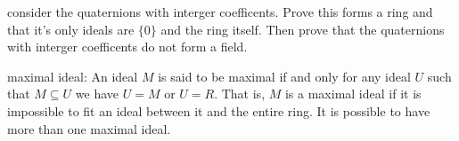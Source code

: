 \documentclass[11pt,largemargins]{homework}
\begin{document}
consider the quaternions with interger coefficents. Prove this forms a ring and that it's only ideals are $\{0\} $ and 
the ring itself. Then prove that the quaternions with interger coefficents do not form a field. 



maximal ideal: 
An ideal $M$ is said to be maximal if and only for any ideal $U$ such that $M \subseteq U$
we have $U = M$ or $U = R$. That is, $M$ is a maximal ideal if it is impossible to fit an ideal between 
it and the entire ring. It is possible to have more than one maximal ideal. 
\end{document}
